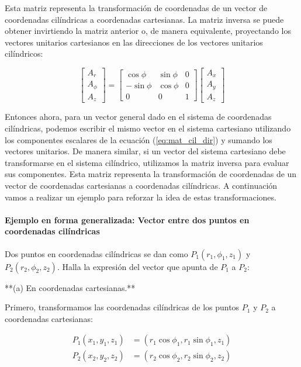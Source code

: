 \documentclass{book}
\begin{document}
Esta matriz representa la transformación de coordenadas de un vector de coordenadas cilíndricas a coordenadas cartesianas.
La matriz inversa se puede obtener invirtiendo la matriz anterior o, de manera equivalente, proyectando los vectores unitarios cartesianos en las direcciones de los vectores unitarios cilíndricos:

\begin{equation*}
\begin{bmatrix} A_r \\ A_{\phi} \\ A_z \end{bmatrix} = 
\begin{bmatrix} \cos \phi & \sin \phi & 0 \\ -\sin \phi & \cos \phi & 0 \\ 0 & 0 & 1 \end{bmatrix}
\begin{bmatrix} A_x \\ A_y \\ A_z \end{bmatrix}
\end{equation*}

Entonces ahora, para un vector general dado en el sistema de coordenadas cilíndricas, podemos escribir el mismo vector en el sistema cartesiano utilizando los componentes escalares de la ecuación (\ref{eq:mat_cil_dir}) y sumando los vectores unitarios. De manera similar, si un vector del sistema cartesiano debe transformarse en el sistema cilíndrico, utilizamos la matriz inversa para evaluar sus componentes.
Esta matriz representa la transformación de coordenadas de un vector de coordenadas cartesianas a coordenadas cilíndricas.
A continuación vamos a realizar un ejemplo para reforzar la idea de estas transformaciones.

\paragraph{Ejemplo en forma generalizada: Vector entre dos puntos en coordenadas cilíndricas}

Dos puntos en coordenadas cilíndricas se dan como $P_1(r_1, \phi_1, z_1)$ y $P_2(r_2, \phi_2, z_2)$. Halla la expresión del vector que apunta de $P_1$ a $P_2$:

**(a) En coordenadas cartesianas.**

Primero, transformamos las coordenadas cilíndricas de los puntos $P_1$ y $P_2$ a coordenadas cartesianas:

\begin{align*}
P_1(x_1, y_1, z_1) &= (r_1 \cos \phi_1, r_1 \sin \phi_1, z_1) \\
P_2(x_2, y_2, z_2) &= (r_2 \cos \phi_2, r_2 \sin \phi_2, z_2)
\end{align*}
\end{document}
